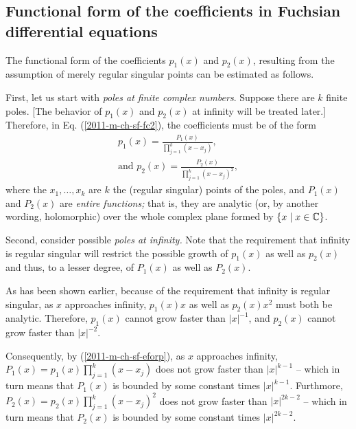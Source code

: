 \subsection{Functional form of the coefficients in Fuchsian differential equations}

The functional form of the coefficients $p_1(x)$ and $p_2(x)$,
resulting from the assumption of merely regular singular points can be estimated as follows.

First, let us start with {\em poles at finite complex numbers}.
Suppose there are $k$ finite poles.
[The behavior of
$p_1(x)$ and $p_2(x)$ at
infinity will be treated later.]
Therefore, in Eq. (\ref{2011-m-ch-sf-fc2}),
the coefficients must be of the form
\begin{equation}
\begin{split}
p_1  (x)  = \frac{P_1(x)}{\prod_{j=1}^k (x-x_j)} ,\\
\textrm{and }
p_2 (x) =  \frac{P_2(x)}{\prod_{j=1}^k (x-x_j)^2} ,
\end{split}
\label{2011-m-ch-sf-eforp}
\end{equation}
where the $x_1,\ldots ,x_k$ are $k$ the (regular singular) points of the poles,
and $P_1(x)$ and $P_2(x)$ are {\em entire functions;}
that is, they are analytic (or, by another wording, holomorphic)
over the whole complex plane formed by $\{x \mid x \in {\Bbb C} \}$.



Second, consider possible {\em poles at infinity.}
Note that the requirement that infinity is regular singular will restrict the possible growth of
$p_1(x)$
as well as
$p_2(x)$
and thus, to a lesser degree, of
$P_1(x)$
as well as
$P_2(x)$.

As has been shown earlier,
because of the requirement that infinity is regular singular, as $x$ approaches infinity,
$p_1(x)x$
as well as
$p_2(x)x^2$
must both be analytic.
Therefore,
$p_1(x)$ cannot grow faster than $\vert x \vert^{-1}$,
and
$p_2(x)$ cannot grow faster than $\vert x \vert^{-2}$.

Consequently, by (\ref{2011-m-ch-sf-eforp}),
as $x$ approaches infinity,
$
P_1 (x) = p_1 (x) \prod_{j=1}^k (x-x_j)
$
does not grow faster than $\vert x \vert^{k-1}$ -- which in turn means that $P_1 (x)$ is bounded by some constant times $\vert x \vert^{k-1}$.
Furthmore,
$
P_2 (x) = p_2(x)\prod_{j=1}^k (x-x_j)^2
$
does not grow faster than $\vert x \vert^{2k-2}$
-- which in turn means that $P_2 (x)$ is bounded by some constant times $\vert x \vert^{2k-2}$.


